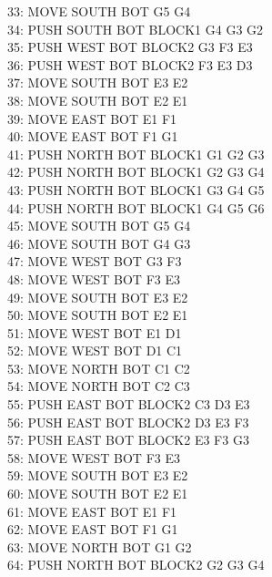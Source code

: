 \documentclass[]{article}
\begin{document}
\begin{enumerate}[(a)]
		          33: MOVE SOUTH BOT G5 G4\\
		          34: PUSH SOUTH BOT BLOCK1 G4 G3 G2\\
		          35: PUSH WEST BOT BLOCK2 G3 F3 E3\\
		          36: PUSH WEST BOT BLOCK2 F3 E3 D3\\
		          37: MOVE SOUTH BOT E3 E2\\
		          38: MOVE SOUTH BOT E2 E1\\
		          39: MOVE EAST BOT E1 F1\\
		          40: MOVE EAST BOT F1 G1\\
		          41: PUSH NORTH BOT BLOCK1 G1 G2 G3\\
		          42: PUSH NORTH BOT BLOCK1 G2 G3 G4\\
		          43: PUSH NORTH BOT BLOCK1 G3 G4 G5\\
		          44: PUSH NORTH BOT BLOCK1 G4 G5 G6\\
		          45: MOVE SOUTH BOT G5 G4\\
		          46: MOVE SOUTH BOT G4 G3\\
		          47: MOVE WEST BOT G3 F3\\
		          48: MOVE WEST BOT F3 E3\\
		          49: MOVE SOUTH BOT E3 E2\\
		          50: MOVE SOUTH BOT E2 E1\\
		          51: MOVE WEST BOT E1 D1\\
		          52: MOVE WEST BOT D1 C1\\
		          53: MOVE NORTH BOT C1 C2\\
		          54: MOVE NORTH BOT C2 C3\\
		          55: PUSH EAST BOT BLOCK2 C3 D3 E3\\
		          56: PUSH EAST BOT BLOCK2 D3 E3 F3\\
		          57: PUSH EAST BOT BLOCK2 E3 F3 G3\\
		          58: MOVE WEST BOT F3 E3\\
		          59: MOVE SOUTH BOT E3 E2\\
		          60: MOVE SOUTH BOT E2 E1\\
		          61: MOVE EAST BOT E1 F1\\
		          62: MOVE EAST BOT F1 G1\\
		          63: MOVE NORTH BOT G1 G2\\
		          64: PUSH NORTH BOT BLOCK2 G2 G3 G4\\

\end{enumerate}
\end{document}
